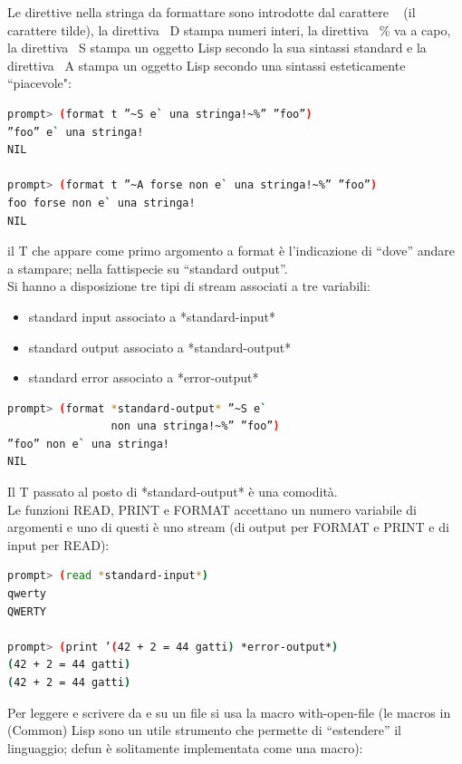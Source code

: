 \documentclass[a4paper,12pt, oneside]{book}
\begin{document}
Le direttive nella stringa da formattare sono introdotte
dal carattere ~ (il carattere tilde), la direttiva ~D stampa numeri interi, la direttiva ~\% va a capo, la direttiva ~S stampa un oggetto Lisp secondo la sua sintassi
standard e la direttiva ~A stampa un oggetto Lisp secondo una sintassi esteticamente “piacevole":
\begin{shaded}
\begin{lstlisting}[language=bash]
prompt> (format t ”~S e` una stringa!~%” ”foo”)
”foo” e` una stringa!
NIL

prompt> (format t ”~A forse non e` una stringa!~%” ”foo”)
foo forse non e` una stringa!
NIL
\end{lstlisting}
\end{shaded}
il T che appare come primo argomento a format è l’indicazione di “dove” andare a stampare; nella fattispecie su
“standard output”.\\
Si hanno a disposizione tre tipi di stream associati a tre variabili:
\begin{itemize}
\item standard input associato a *standard-input*
\item standard output associato a *standard-output*
\item standard error associato a *error-output*
\end{itemize}
\begin{shaded}
\begin{lstlisting}[language=bash]
prompt> (format *standard-output* ”~S e` 
                non una stringa!~%” ”foo”)
”foo” non e` una stringa!
NIL
\end{lstlisting}
\end{shaded}
Il T passato al posto di *standard-output* è una comodità.\\
Le funzioni READ, PRINT e FORMAT accettano un numero variabile di argomenti e uno di questi è uno stream (di output per FORMAT e PRINT e di input per
READ):
\begin{shaded}
\begin{lstlisting}[language=bash]
prompt> (read *standard-input*)
qwerty
QWERTY

prompt> (print ’(42 + 2 = 44 gatti) *error-output*)
(42 + 2 = 44 gatti)
(42 + 2 = 44 gatti)
\end{lstlisting}
\end{shaded}
Per leggere e scrivere da e su un file si usa
la macro with-open-file (le macros in (Common) Lisp sono un utile strumento che permette di “estendere” il
linguaggio; defun è solitamente implementata come una macro):
\end{document}
